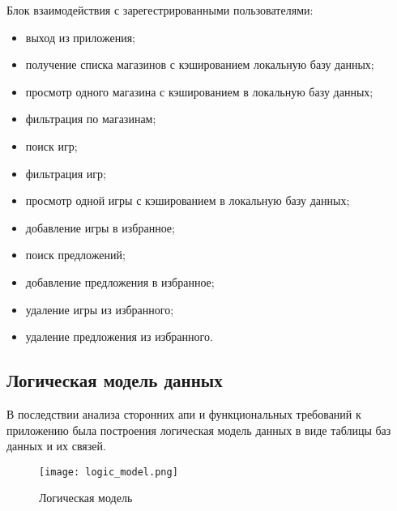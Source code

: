 Блок взаимодействия с зарегестрированными пользователями:

\begin{itemize}
    \item выход из приложения;
    \item получение списка магазинов с кэшированием локальную базу данных;
    \item просмотр одного магазина с кэшированием в локальную базу данных;
    \item фильтрация по магазинам;
    \item поиск игр;
    \item фильтрация игр;
    \item просмотр одной игры с кэшированием в локальную базу данных;
    \item добавление игры в избранное;
    \item поиск предложений;
    \item добавление предложения в избранное;
    \item удаление игры из избранного;
    \item удаление предложения из избранного.
\end{itemize}


\subsection{Логическая модель данных}

В последствии анализа сторонних апи и функциональных требований к приложению была построения логическая модель данных в виде таблицы баз данных и их связей.

\begin{figure}[H]
 \centering
   \texttt{[image: logic\_model.png]} 
   \caption{Логическая модель}
   \label{fig:domain:logic_model}
\end{figure}

